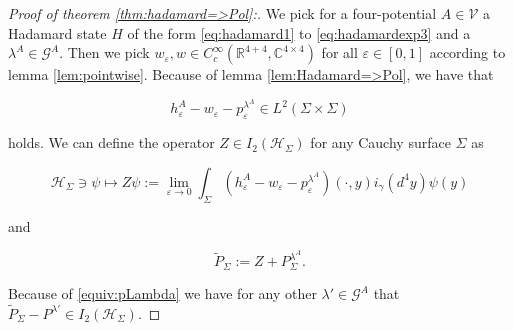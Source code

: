 \documentclass[b5paper,draft,openbib,12pt]{memoir}
\begin{document}
\begin{proof}[Proof of theorem \ref{thm:hadamard=>Pol}:]

We pick for a four-potential \(A\in \mathcal{V}\) a Hadamard state \(H\) of the form \eqref{eq:hadamard1} to \eqref{eq:hadamardexp3} 
and a \(\lambda^A\in\mathcal{G}^A\). Then we pick 
\(w_\varepsilon,w \in C_c^\infty(\mathbb{R}^{4+4},\mathbb{C}^{4\times 4})\) for all \(\varepsilon\in [0,1]\) according to lemma \ref{lem:pointwise}.
Because of lemma \ref{lem:Hadamard=>Pol}, we have that

\begin{equation}
h_\varepsilon^A-w_\varepsilon-p^{\lambda^A}_\varepsilon \in L^2(\Sigma\times\Sigma)
\end{equation}

holds. We can define the operator \(Z \in I_2(\mathcal{H}_\Sigma)\) for any Cauchy surface \(\Sigma\) as

\begin{equation}
\mathcal{H}_\Sigma\ni \psi\mapsto Z \psi := \lim_{\varepsilon \rightarrow 0} 
\int_{\Sigma} (h_\varepsilon^A-w_\varepsilon-p^{\lambda^A}_\varepsilon)(\cdot,y) i_\gamma(d^4y) \psi(y) 
\end{equation}

and

\begin{equation}
\tilde{P}_\Sigma:=Z + P^{\lambda^A}_\Sigma.
\end{equation}

Because of \eqref{equiv:pLambda} we have for any other \(\lambda' \in\mathcal{G}^A\) that \(\tilde{P}_\Sigma-P^{\lambda'}\in I_2(\mathcal{H}_\Sigma)\).


\end{proof}
\end{document}
